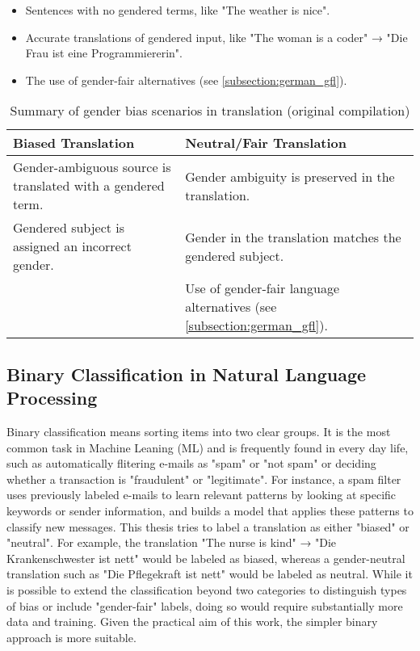         \begin{itemize}
        \item Sentences with no gendered terms, like "The weather is nice".
        \item Accurate translations of gendered input, like "The woman is a coder" → "Die Frau ist eine Programmiererin".
        \item The use of gender-fair alternatives (see \autoref{subsection:german_gfl}).
        \end{itemize}

    \begin{table}[htb]
    \centering
    \begin{tabularx}{\linewidth}{X | X}
        \toprule
        \textbf{Biased Translation} & \textbf{Neutral/Fair Translation} \\
        \midrule
        Gender-ambiguous source is translated with a gendered term. & 
        Gender ambiguity is preserved in the translation. \\
        \addlinespace[0.5em]
        Gendered subject is assigned an incorrect gender. & 
        Gender in the translation matches the gendered subject. \\
        \addlinespace[0.5em]
        \multicolumn{1}{c|}{—} & 
        Use of gender-fair language alternatives (see \autoref{subsection:german_gfl}). \\
        \bottomrule
    \end{tabularx}
    \caption[Summary of gender bias scenarios in translation]{Summary of gender bias scenarios in translation (original compilation)}
    \label{tab:overview_bias_neutral}
    \end{table}

    \subsection{Binary Classification in Natural Language Processing}
    Binary classification means sorting items into two clear groups. It is the most common task in Machine Leaning (ML) and is frequently found in every day life, such as automatically flitering e-mails as "spam" or "not spam" \parencite{quemyBinaryClassificationUnstructured2019} or deciding whether a transaction is "fraudulent" or "legitimate". For instance, a spam filter uses previously labeled e-mails to learn relevant patterns by looking at specific keywords or sender information, and builds a model that applies these patterns to classify new messages. This thesis tries to label a translation as either "biased" or "neutral". For example, the translation "The nurse is kind" → "Die Krankenschwester ist nett" would be labeled as biased, whereas a gender-neutral translation such as "Die Pflegekraft ist nett" would be labeled as neutral. While it is possible to extend the classification beyond two categories to distinguish types of bias or include "gender-fair" labels, doing so would require substantially more data and training. Given the practical aim of this work, the simpler binary approach is more suitable.

